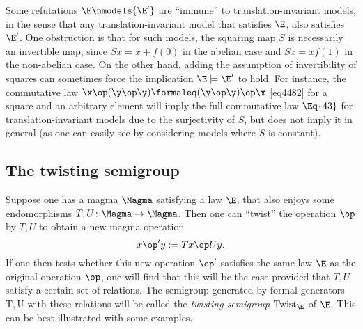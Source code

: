   Some refutations $\E \nmodels {\E'}$ are ``immune'' to translation-invariant models, in the sense that any translation-invariant model that satisfies $\E$, also satisfies ${\E'}$.  One obstruction is that for such models, the squaring map $S$ is necessarily an invertible map, since $Sx = x + f(0)$ in the abelian case and $Sx = xf(1)$ in the non-abelian case. On the other hand, adding the assumption of invertibility of squares can sometimes force the implication $\E \models {\E'}$ to hold.  For instance, the commutative law $\x \op (\y \op \y) \formaleq (\y \op \y) \op \x$ \eqref{eq4482} for a square and an arbitrary element will imply the full commutative law $\Eq{43}$ for translation-invariant models due to the surjectivity of $S$, but does not imply it in general (as one can easily see by considering models where $S$ is constant).

\subsection{The twisting semigroup}\label{twisting-sec}

Suppose one has a magma $\Magma$ satisfying a law $\E$, that also enjoys some endomorphisms $T, U \colon \Magma \to \Magma$.  Then one can ``twist'' the operation $\op$ by $T,U$ to obtain a new magma operation
\begin{equation}\label{twist} x \op' y := Tx \op Uy.
\end{equation}
If one then tests whether this new operation $\op'$ satisfies the same law $\E$ as the original operation $\op$, one will find that this will be the case provided that $T,U$ satisfy a certain set of relations.  The semigroup generated by formal generators $\mathrm{T}, \mathrm{U}$ with these relations will be called the \emph{twisting semigroup} $\operatorname{Twist}_\E$ of $\E$.  This can be best illustrated with some examples.

